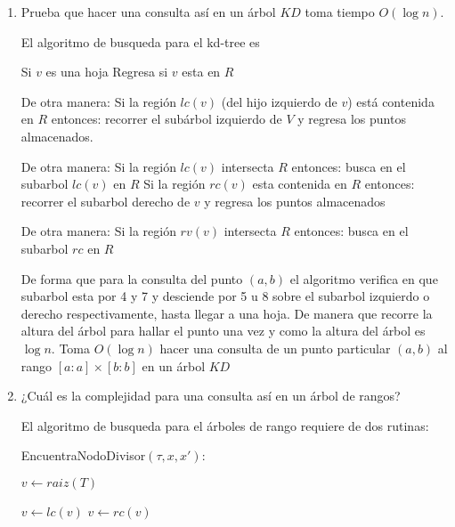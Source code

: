 \begin{enumerate}
   \item Prueba que hacer una consulta así en un árbol $KD$ toma tiempo $O(\log n)$.
   
   El algoritmo de busqueda para el kd-tree es
   
   \begin{algorithmic}[1]
      \State Si $v$ es una hoja
         \State Regresa si $v$ esta en $R$
      
      \State De otra manera:
      \State Si la región $lc(v)$ (del hijo izquierdo de $v$) está contenida en $R$ entonces: 
               recorrer el subárbol izquierdo de $V$ y regresa los puntos almacenados.

      \State De otra manera:
      \State Si la región $lc(v)$ intersecta $R$ entonces: 
               busca en el subarbol $lc(v)$ en $R$
      \State Si la región $rc(v)$ esta contenida en $R$ entonces:
               recorrer el subarbol derecho de $v$ y regresa los puntos almacenados

      \State De otra manera:
      \State Si la región $rv(v)$ intersecta $R$ entonces:
               busca en el subarbol $rc$ en $R$
       
      \end{algorithmic}
      De forma que para la consulta del punto $(a,b)$ el algoritmo verifica en que subarbol esta por 4 y 7 y desciende por 5 u 8 sobre el subarbol izquierdo o derecho respectivamente, hasta llegar a una hoja. De manera que recorre la altura del árbol para hallar el punto una vez y como la altura del árbol es $\log n$. Toma $O(\log n)$ hacer una consulta de un punto particular $(a,b)$ al rango $[a:a] \times [b:b]$ en un árbol $KD$ 
  
      \item ¿Cuál es la complejidad para una consulta así en un árbol de rangos?
      
      El algoritmo de busqueda para el árboles de rango requiere de dos rutinas:

      EncuentraNodoDivisor$(\tau,x,x')$:
      \begin{algorithmic}[1]
         \State $v \gets raiz(T)$



            \State $v \gets lc(v)$
            \Else 
            \State $v \gets rc(v)$
         \EndIf
         \EndWhile
         \end{algorithmic}


\end{enumerate}
